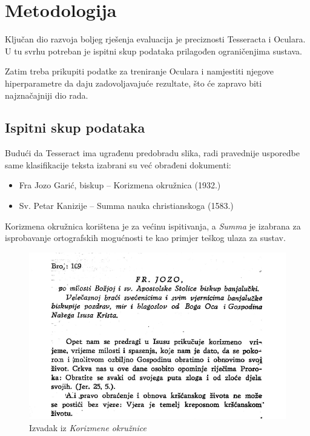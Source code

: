 \documentclass[zavrsnirad]{fer}
\begin{document}
\chapter{Metodologija}
\label{pog:metodologija}

Ključan dio razvoja boljeg rješenja evaluacija je preciznosti Tesseracta i Oculara. U tu svrhu potreban je ispitni skup podataka prilagođen ograničenjima sustava. 

Zatim treba prikupiti podatke za treniranje Oculara i namjestiti njegove hiperparametre da daju zadovoljavajuće rezultate, što će zapravo biti najznačajniji dio rada.


\section{Ispitni skup podataka}

Budući da Tesseract ima ugrađenu predobradu slika, radi pravednije usporedbe same klasifikacije teksta izabrani su već obrađeni dokumenti:

\begin{itemize}
	\item Fra Jozo Garić, biskup – Korizmena okružnica (1932.)
	\item Sv. Petar Kanizije – Summa nauka christianskoga (1583.)
\end{itemize}

Korizmena okružnica korištena je za većinu ispitivanja, a \textit{Summa} je izabrana za isprobavanje ortografskih mogućnosti te kao primjer teškog ulaza za sustav.

\begin{figure}[h!]
	\centering
	\includegraphics[width=1.0\linewidth]{Figures/korizmena.png} 
	\caption{Izvadak iz \textit{Korizmene okružnice}}
	\label{slk:korizmena}
\end{figure}
\end{document}
